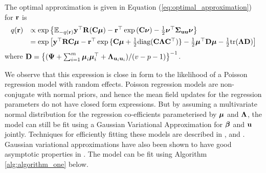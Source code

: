 
The optimal approximation is given in Equation (\ref{eq:optimal_approximation})
for ${\bf r}$ is
\begin{equation}
\label{eq:optimal_approximation}
\begin{array}{rl}
	q({\bf r}) & \propto \exp \left \{ {\mathbb E}_{-q({\bf r})}{\bf y}^\top{\bf R}({\bf C}{\boldsymbol \mu}) - {\bf r}^\top\exp{({\bf C}{\boldsymbol\nu})}-\frac{1}{2} {\boldsymbol \nu}^\top {\boldsymbol\Sigma}_{{\bf u} {\bf u}} {\boldsymbol \nu} \right \}                                                  \\ [1ex]
	       & = \exp{ \left[ {\bf y}^\top{\bf R}{\bf C}{\boldsymbol\mu}- {\bf r}^\top \exp{\{{\bf C}{\boldsymbol\mu}+ \frac{1}{2} \text{diag}({\bf C}{\boldsymbol\Lambda}{\bf C}^\top)\}} - \frac{1}{2} {\boldsymbol\mu}^\top {\bf D}{\boldsymbol\mu}- \frac{1}{2} \text{tr}({\boldsymbol\Lambda}{\bf D}) \right] } 
\end{array}
\end{equation}
\noindent where ${\bf D} = \left\{ ({\boldsymbol \Psi} + \sum_{i=1}^m {\boldsymbol \mu}_i {\boldsymbol \mu}_i^\top + {\boldsymbol \Lambda}_{{\bf u}_i{\bf u}_i}) / (v - p - 1) \right\}^{-1}$. 

We observe that this expression is close in form to the likelihood of a Poisson regression model with random
effects. Poisson regression models are non-conjugate with normal priors, and hence the mean field updates for
the regression parameters do not have closed form expressions. But by assuming a multivariate normal
distribution for the regression co-efficients parameterised by ${\boldsymbol \mu}$ and ${\boldsymbol \Lambda}$, the model can still be
fit using a Gaussian Variational Approximation for ${\boldsymbol \beta}$ and ${\bf u}$ jointly. Techniques for efficiently
fitting these models are described in \cite{Ormerod2012}, \cite{Challis2013} and \cite{Opper2009}. Gaussian
variational approximations have also been shown to have good asymptotic properties in \cite{Sinica2017}. The
model can be fit using Algorithm \ref{alg:algorithm_one} below.

